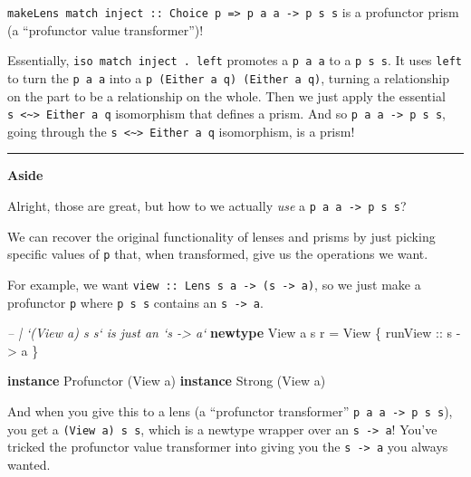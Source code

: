 \documentclass[]{article}
\newenvironment{Shaded}{}{}
\newcommand{\CommentTok}[1]{\textcolor[rgb]{0.38,0.63,0.69}{\textit{#1}}}
\newcommand{\DataTypeTok}[1]{\textcolor[rgb]{0.56,0.13,0.00}{#1}}
\newcommand{\FunctionTok}[1]{\textcolor[rgb]{0.02,0.16,0.49}{#1}}
\newcommand{\KeywordTok}[1]{\textcolor[rgb]{0.00,0.44,0.13}{\textbf{#1}}}
\newcommand{\NormalTok}[1]{#1}
\newcommand{\OtherTok}[1]{\textcolor[rgb]{0.00,0.44,0.13}{#1}}
\begin{document}
\texttt{makeLens\ match\ inject\ ::\ Choice\ p\ =\textgreater{}\ p\ a\ a\ -\textgreater{}\ p\ s\ s}
is a profunctor prism (a ``profunctor value transformer'')!

Essentially, \texttt{iso\ match\ inject\ .\ left\textquotesingle{}} promotes a
\texttt{p\ a\ a} to a \texttt{p\ s\ s}. It uses \texttt{left\textquotesingle{}}
to turn the \texttt{p\ a\ a} into a \texttt{p\ (Either\ a\ q)\ (Either\ a\ q)},
turning a relationship on the part to be a relationship on the whole. Then we
just apply the essential
\texttt{s\ \textless{}\textasciitilde{}\textgreater{}\ Either\ a\ q} isomorphism
that defines a prism. And so \texttt{p\ a\ a\ -\textgreater{}\ p\ s\ s}, going
through the \texttt{s\ \textless{}\textasciitilde{}\textgreater{}\ Either\ a\ q}
isomorphism, is a prism!

\begin{center}\rule{0.5\linewidth}{\linethickness}\end{center}

\textbf{Aside}

Alright, those are great, but how to we actually \emph{use} a
\texttt{p\ a\ a\ -\textgreater{}\ p\ s\ s}?

We can recover the original functionality of lenses and prisms by just picking
specific values of \texttt{p} that, when transformed, give us the operations we
want.

For example, we want
\texttt{view\ ::\ Lens\textquotesingle{}\ s\ a\ -\textgreater{}\ (s\ -\textgreater{}\ a)},
so we just make a profunctor \texttt{p} where \texttt{p\ s\ s} contains an
\texttt{s\ -\textgreater{}\ a}.

\begin{Shaded}
\begin{Highlighting}[]
\CommentTok{-- | `(View a) s s` is just an `s -> a`}
\KeywordTok{newtype} \DataTypeTok{View}\NormalTok{ a s r }\FunctionTok{=} \DataTypeTok{View}\NormalTok{ \{}\OtherTok{ runView ::}\NormalTok{ s }\OtherTok{->}\NormalTok{ a \}}

\KeywordTok{instance} \DataTypeTok{Profunctor}\NormalTok{ (}\DataTypeTok{View}\NormalTok{ a)}
\KeywordTok{instance} \DataTypeTok{Strong}\NormalTok{ (}\DataTypeTok{View}\NormalTok{ a)}
\end{Highlighting}
\end{Shaded}

And when you give this to a lens (a ``profunctor transformer''
\texttt{p\ a\ a\ -\textgreater{}\ p\ s\ s}), you get a \texttt{(View\ a)\ s\ s},
which is a newtype wrapper over an \texttt{s\ -\textgreater{}\ a}! You've
tricked the profunctor value transformer into giving you the
\texttt{s\ -\textgreater{}\ a} you always wanted.
\end{document}
